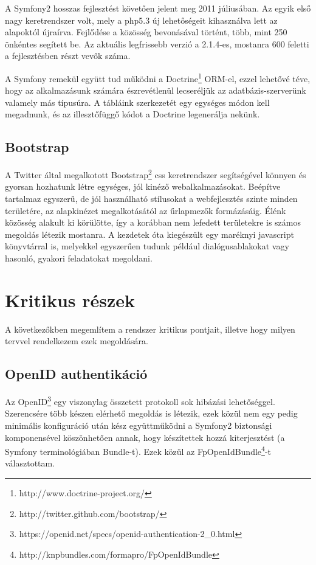 \documentclass[a4paper,12pt,oneside]{report}
\begin{document}
A Symfony2 hosszas fejlesztést követően jelent meg 2011 júliusában. Az egyik első nagy keretrendszer volt, mely a php5.3 új lehetőségeit kihasználva lett az alapoktól újraírva. Fejlődése a közösség bevonásával történt, több, mint 250 önkéntes segített be. Az aktuális legfrissebb verzió a 2.1.4-es, mostanra 600 feletti a fejlesztésben részt vevők száma.

A Symfony remekül együtt tud működni a Doctrine\footnote{http://www.doctrine-project.org/} ORM-el, ezzel lehetővé téve, hogy az alkalmazásunk számára észrevétlenül lecseréljük az adatbázis-szerverünk valamely más típusúra. A tábláink szerkezetét egy egységes módon kell megadnunk, és az illesztőfüggő kódot a Doctrine legenerálja nekünk.

\subsection{Bootstrap}

A Twitter által megalkotott Bootstrap\footnote{http://twitter.github.com/bootstrap/} css keretrendszer segítségével könnyen és gyorsan hozhatunk létre egységes, jól kinéző webalkalmazásokat. Beépítve tartalmaz egyszerű, de jól használható stílusokat a webfejlesztés szinte minden területére, az alapkinézet megalkotásától az űrlapmezők formázásáig. Élénk közösség alakult ki körülötte, így a korábban nem lefedett területekre is számos megoldás létezik mostanra. A kezdetek óta kiegészült egy maréknyi javascript könyvtárral is, melyekkel egyszerűen tudunk például dialógusablakokat vagy hasonló, gyakori feladatokat megoldani.

\section{Kritikus részek}

A következőkben megemlítem a rendszer kritikus pontjait, illetve hogy milyen tervvel rendelkezem ezek megoldására.

\subsection{OpenID authentikáció}

Az OpenID\footnote{https://openid.net/specs/openid-authentication-2\_0.html} egy viszonylag összetett protokoll sok hibázási lehetőséggel. Szerencsére több készen elérhető megoldás is létezik, ezek közül nem egy pedig minimális konfiguráció után kész együttműködni a Symfony2 biztonsági komponensével köszönhetően annak, hogy készítettek hozzá kiterjesztést (a Symfony terminológiában Bundle-t). Ezek közül az FpOpenIdBundle\footnote{http://knpbundles.com/formapro/FpOpenIdBundle}-t választottam.
\end{document}
